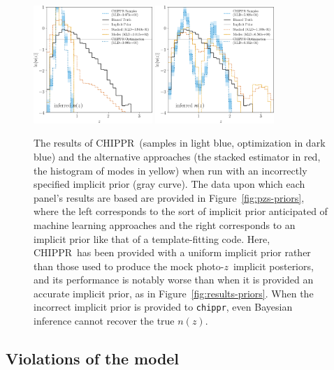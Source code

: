 \documentclass[iop]{emulateapj}
\newcommand{\project}[1]{\textsc{#1}}
\newcommand{\Chippr}{\project{CHIPPR}}
\newcommand{\repo}[1]{\texttt{#1}}
\newcommand{\chippr}{\repo{chippr}}
\newcommand{\pz}{photo-$z$}
\newcommand{\pzip}{\pz\ implicit posterior}
\newcommand{\nz}{$n(z)$}
\begin{document}
\begin{figure}
	\begin{center}
		\includegraphics[width=0.4\textwidth]{results_wrongprior_training.png}
		\includegraphics[width=0.4\textwidth]{results_wrongprior_template.png}
		\caption
		{The results of \Chippr\ (samples in light blue, optimization in dark blue) and the alternative approaches (the stacked estimator in red, the histogram of modes in yellow) when run with an incorrectly specified implicit prior (gray curve).
			The data upon which each panel's results are based are provided in Figure~\ref{fig:pzs-priors}, where the left corresponds to the sort of implicit prior anticipated of machine learning approaches and the right corresponds to an implicit prior like that of a template-fitting code.
			Here, \Chippr\ has been provided with a uniform implicit prior rather than those used to produce the mock \pzip s, and its performance is notably worse than when it is provided an accurate implicit prior, as in Figure~\ref{fig:results-priors}.
			When the incorrect implicit prior is provided to \chippr, even Bayesian inference cannot recover the true \nz.
		}
		\label{fig:mischaracterized}
	\end{center}
\end{figure}

\subsection{Violations of the model}
\label{sec:violations}
\end{document}
